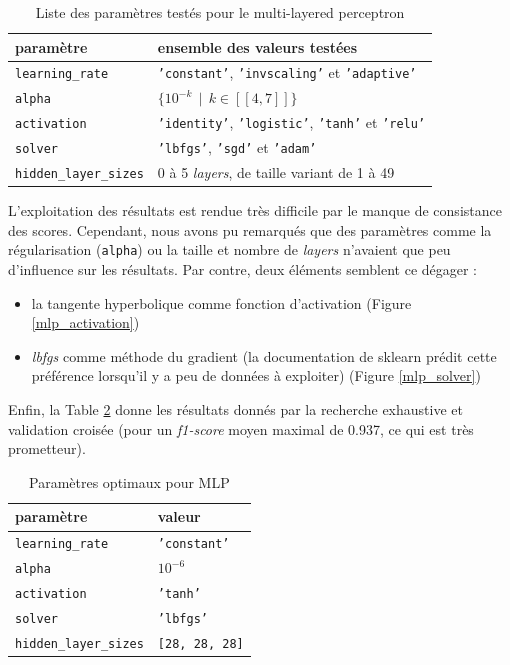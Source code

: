 \documentclass[a4paper]{report}
\begin{document}
\begin{table}
\centering
\begin{tabular}{l l}
paramètre & ensemble des valeurs testées \\
\hline
\texttt{learning\_rate} & \texttt{'constant'}, \texttt{'invscaling'} et \texttt{'adaptive'}\\
\texttt{alpha} & $\{10^{-k} \>\> | \>\> k \in [\![4, 7]\!] \}$ \\
\texttt{activation} & \texttt{'identity'}, \texttt{'logistic'}, \texttt{'tanh'} et \texttt{'relu'} \\
\texttt{solver} &\texttt{'lbfgs'}, \texttt{'sgd'} et \texttt{'adam'}\\
\texttt{hidden\_layer\_sizes} & 0 à 5 \emph{layers}, de taille variant de 1 à 49\\
\end{tabular}
\caption{Liste des paramètres testés pour le multi-layered perceptron\label{params_mlp}}
\end{table}

L'exploitation des résultats est rendue très difficile par le manque de consistance des scores. Cependant, nous avons pu remarqués que des paramètres comme la régularisation (\texttt{alpha}) ou la taille et nombre de \emph{layers} n'avaient que peu d'influence sur les résultats. Par contre, deux éléments semblent ce dégager : \begin{itemize}
\item la tangente hyperbolique comme fonction d'activation (Figure \ref{mlp_activation})
\item \emph{lbfgs} comme méthode du gradient (la documentation de sklearn prédit cette préférence lorsqu'il y a peu de données à exploiter) (Figure \ref{mlp_solver})
\end{itemize}
Enfin, la Table \ref{best_params_mlp} donne les résultats donnés par la recherche exhaustive et validation croisée (pour un \emph{f1-score} moyen maximal de 0.937, ce qui est très prometteur).

\begin{table}
\centering
\begin{tabular}{ll}
paramètre & valeur \\
\hline
\texttt{learning\_rate} & \texttt{'constant'} \\
\texttt{alpha} & \texttt{$10^{-6}$} \\
\texttt{activation} & \texttt{'tanh'} \\
\texttt{solver} & \texttt{'lbfgs'} \\
\texttt{hidden\_layer\_sizes} & \texttt{[28, 28, 28]}\\
\end{tabular}
\caption{Paramètres optimaux pour MLP\label{best_params_mlp}}
\end{table}
\end{document}
